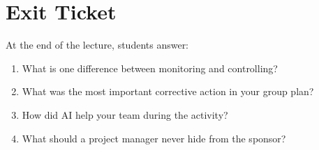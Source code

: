 \documentclass[11pt,a4paper]{article}
\begin{document}
\section*{Exit Ticket}

At the end of the lecture, students answer:

\begin{enumerate}
  \item What is one difference between monitoring and controlling?
  \item What was the most important corrective action in your group plan?
  \item How did AI help your team during the activity?
  \item What should a project manager never hide from the sponsor?
\end{enumerate}
\end{document}
